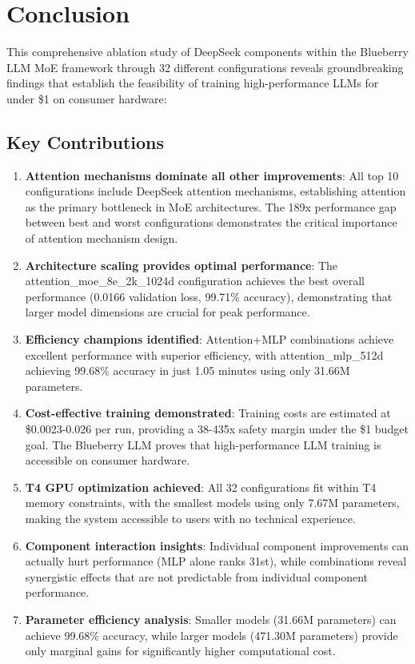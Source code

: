 \documentclass[11pt,a4paper]{article}
\begin{document}
\section{Conclusion}

This comprehensive ablation study of DeepSeek components within the Blueberry LLM MoE framework through 32 different configurations reveals groundbreaking findings that establish the feasibility of training high-performance LLMs for under \$1 on consumer hardware:

\subsection{Key Contributions}

\begin{enumerate}
    \item \textbf{Attention mechanisms dominate all other improvements}: All top 10 configurations include DeepSeek attention mechanisms, establishing attention as the primary bottleneck in MoE architectures. The 189x performance gap between best and worst configurations demonstrates the critical importance of attention mechanism design.
    
    \item \textbf{Architecture scaling provides optimal performance}: The attention\_moe\_8e\_2k\_1024d configuration achieves the best overall performance (0.0166 validation loss, 99.71\% accuracy), demonstrating that larger model dimensions are crucial for peak performance.
    
    \item \textbf{Efficiency champions identified}: Attention+MLP combinations achieve excellent performance with superior efficiency, with attention\_mlp\_512d achieving 99.68\% accuracy in just 1.05 minutes using only 31.66M parameters.
    
    \item \textbf{Cost-effective training demonstrated}: Training costs are estimated at \$0.0023-0.026 per run, providing a 38-435x safety margin under the \$1 budget goal. The Blueberry LLM proves that high-performance LLM training is accessible on consumer hardware.
    
    \item \textbf{T4 GPU optimization achieved}: All 32 configurations fit within T4 memory constraints, with the smallest models using only 7.67M parameters, making the system accessible to users with no technical experience.
    
    \item \textbf{Component interaction insights}: Individual component improvements can actually hurt performance (MLP alone ranks 31st), while combinations reveal synergistic effects that are not predictable from individual component performance.
    
    \item \textbf{Parameter efficiency analysis}: Smaller models (31.66M parameters) can achieve 99.68\% accuracy, while larger models (471.30M parameters) provide only marginal gains for significantly higher computational cost.
\end{enumerate}
\end{document}

